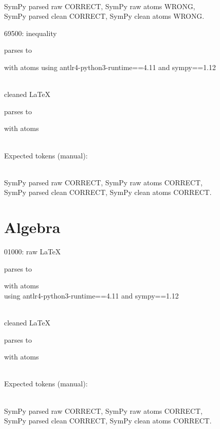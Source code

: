\documentclass{article}
\begin{document}
\ \\
SymPy parsed raw CORRECT, 
SymPy raw atoms WRONG, \\
SymPy parsed clean CORRECT, 
SymPy clean atoms WRONG.

\hrulefill

69500:
inequality

parses to

with atoms
using antlr4-python3-runtime==4.11 and sympy==1.12

\ \\
cleaned \LaTeX

parses to

with atoms


\ \\
Expected tokens (manual):



\ \\
SymPy parsed raw CORRECT, 
SymPy raw atoms CORRECT, \\
SymPy parsed clean CORRECT, 
SymPy clean atoms CORRECT.

\hrulefill

\section{Algebra}


\hrulefill

01000:
raw \LaTeX

parses to 

with atoms 
\\
using antlr4-python3-runtime==4.11 and sympy==1.12

\ \\
cleaned \LaTeX

parses to 

with atoms 


\ \\
Expected tokens (manual): 


\ \\
SymPy parsed raw CORRECT, 
SymPy raw atoms CORRECT, \\
SymPy parsed clean CORRECT, 
SymPy clean atoms CORRECT.
\end{document}
